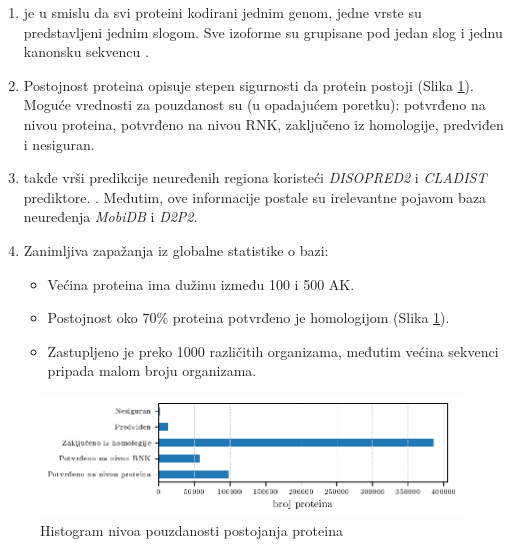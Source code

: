 \begin{enumerate}
  \item
    \label{red}
    \swissprot je  u smislu da svi proteini
    kodirani jednim genom, jedne vrste su predstavljeni jednim slogom. Sve
    izoforme su grupisane pod jedan slog i jednu kanonsku sekvencu \parencite{nonRedundant}.

  \item Postojnost proteina   opisuje stepen
    sigurnosti da protein postoji (Slika \ref{fig:PE}). Moguće vrednosti za pouzdanost su (u opadajućem poretku):
    potvrđeno na nivou proteina, potvrđeno na nivou RNK, zaključeno iz homologije, predviđen i nesiguran. 

  \clearpage


  \item
    \swissprot takđe vrši predikcije neuređenih regiona koristeći \textit{DISOPRED2}
    i \textit{CLADIST} prediktore. \parencite{Meng_c2017}. Međutim, ove informacije
    postale su irelevantne pojavom baza neuređenja \textit{MobiDB}\parencite{Piovesan2017} i \textit{D2P2}\parencite{Oates2012}.

  \item Zanimljiva zapažanja iz globalne statistike o \swissprot bazi:
    \begin{itemize}
      \item Većina proteina ima dužinu između 100 i 500 AK.
      \item Postojnost oko $70\%$ proteina potvrđeno je homologijom (Slika \ref{fig:PE}).
      \item Zastupljeno je preko 1000 različitih organizama, međutim
        većina \swissprot sekvenci pripada malom broju organizama.
    \end{itemize}
      


\end{enumerate}

\begin{figure}[h!]
  \centering
  \hspace*{-1cm} 
  \includegraphics[]{plots/PE.pdf}
  \caption{Histogram nivoa pouzdanosti postojanja \swissprot proteina}
  \label{fig:PE}
\end{figure}

%
%
%













